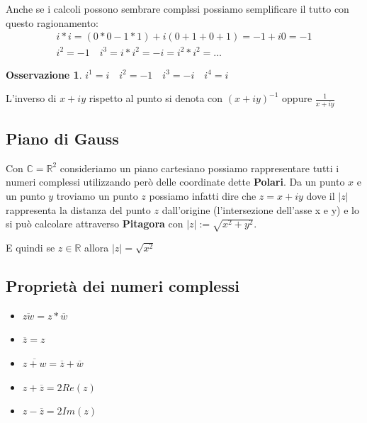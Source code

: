 \documentclass{article}
\newtheorem{oss}{Osservazione}[section]
\begin{document}
Anche se i calcoli possono sembrare complssi possiamo semplificare il tutto con questo ragionamento:
\begin{align*}
        i * i = (0*0 - 1*1) + i(0+1 + 0+1) = -1+ i0 = -1 \\
        i^2 = -1 \quad i^3 = i * i^2 = -i = i^2 * i^2 = \ldots 
\end{align*}

\begin{oss}
        $\boxed{ i^1 = i \quad i^2 = -1 \quad i^3 = -i \quad i^4 = i}$
\end{oss}


L'inverso di $x + iy$ rispetto al punto si denota con ${(x + iy)}^{-1}$ oppure $\frac{1}{x + iy}$



\subsection{Piano di Gauss}
Con $\mathbb{C} = \mathbb{R}^2$ consideriamo un piano cartesiano possiamo rappresentare tutti i numeri complessi utilizzando però delle coordinate dette \textbf{Polari}.
Da un punto $x$ e un punto $y$ troviamo un punto $z$ possiamo infatti dire che $z = x+iy$ dove il $|z|$  rappresenta la distanza del punto $z$ dall'origine (l'intersezione dell'asse x e y) e lo si può calcolare attraverso \textbf{Pitagora} con $|z| := \sqrt{x^2+y^2}$. \par
E quindi se $z \in \mathbb{R}$ allora $|z| = \sqrt{x^2}$


\subsection{Proprietà dei numeri complessi}

\begin{itemize}
        \item $\overline{zw} = z * \overline{w}$ \\
        \item $\overline{z} = z$ \\
        \item $\overline{z+w} = \overline{z} + \overline{w}$ \\
        \item $z+\overline{z}=2Re(z)$ \\
        \item $z - \overline{z}=2Im(z)$ \\
\end{itemize}
\end{document}
